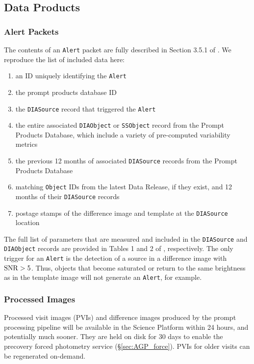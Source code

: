 \subsection{Data Products}
\subsubsection{Alert Packets}\label{sec:packets}

The contents of an {\tt Alert} packet are fully described in Section 3.5.1 of . We reproduce the list of included data here:
\renewcommand{\labelenumi}{\Roman{enumi}.}
\begin{enumerate}
\item an ID uniquely identifying the {\tt Alert}
\item the prompt products database ID
\item the {\tt DIASource} record that triggered the {\tt Alert}
\item the entire associated {\tt DIAObject} or {\tt SSObject} record from the Prompt Products Database, which include a variety of pre-computed variability metrics
\item the previous 12 months of associated {\tt DIASource} records from the Prompt Products Database
\item matching {\tt Object} IDs from the latest Data Release, if they exist, and 12 months of their {\tt DIASource} records
\item postage stamps of the difference image and template at the {\tt DIASource} location
\end{enumerate}

The full list of parameters that are measured and included in the {\tt DIASource} and {\tt DIAObject} records are provided in Tables 1 and 2 of , respectively.
The only trigger for an {\tt Alert} is the detection of a source in a difference image with ${\rm SNR} > 5$. 
Thus, objects that become saturated or return to the same brightness as in the template image will not generate an {\tt Alert}, for example.

\subsubsection{Processed Images} \label{sec:products}

Processed visit images (PVIs) and difference images produced by the prompt processing pipeline will be available in the Science Platform within 24 hours, and potentially much sooner.
They are held on disk for 30 days to enable the precovery forced photometry service (\S \ref{sec:AGP_force}).
PVIs for older visits can be regenerated on-demand.

